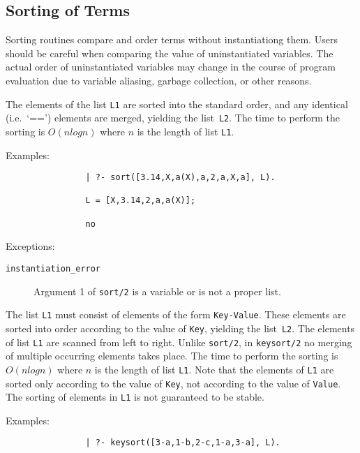 \subsection{Sorting of Terms}

Sorting routines compare and order terms without instantiationg them.
Users should be careful when comparing the value of uninstantiated
variables.  The actual order of uninstantiated variables may change in
the course of program evaluation due to variable aliasing, garbage
collection, or other reasons.

\begin{description}
    The elements of the list {\tt L1} are sorted into the standard order,
    and any identical (i.e.\ `==') elements are merged, yielding the 
    list~{\tt L2}.  The time to perform the sorting is $O(n log n)$ where 
    $n$ is the length of list {\tt L1}.  

    Examples:
    {\footnotesize
     \begin{verbatim}
                | ?- sort([3.14,X,a(X),a,2,a,X,a], L).

                L = [X,3.14,2,a,a(X)];

                no
     \end{verbatim}}
    Exceptions:
    \begin{description}
    \item[{\tt instantiation\_error}]
	Argument 1 of {\tt sort/2} is a variable or is not a proper list.
    \end{description}


    The list {\tt L1} must consist of elements of the form \verb'Key-Value'.
    These elements are sorted into order according to the value of {\tt Key},
    yielding the list~{\tt L2}.  The elements of list {\tt L1} are scanned
    from left to right.  Unlike {\tt sort/2}, in {\tt keysort/2} no
    merging of multiple occurring elements takes place.  The time to perform
    the sorting is $O(n log n)$ where $n$ is the length of list {\tt L1}.  
    Note that the elements of {\tt L1} are sorted only according to the
    value of {\tt Key}, not according to the value of {\tt Value}.  The 
    sorting of elements in {\tt L1} is not guaranteed to be stable.

    Examples:
    {\footnotesize
     \begin{verbatim}
                | ?- keysort([3-a,1-b,2-c,1-a,3-a], L).


\end{verbatim}}
\end{description}
